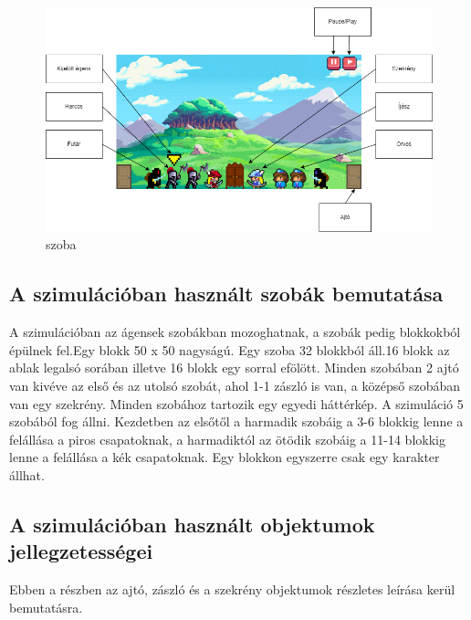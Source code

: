 \begin{figure}[!ht]
	\centering
	\includegraphics[width=\textwidth]{images/scene.png}
    \caption{szoba}
    \label{fig:scene}
\end{figure}
\newpage
\subsection{A szimulációban használt szobák bemutatása}

A szimulációban az ágensek szobákban mozoghatnak, a szobák pedig blokkokból épülnek fel.Egy blokk 50 x 50 nagyságú. Egy szoba 32  blokkból áll.16 blokk az ablak legalsó sorában illetve 16 blokk egy sorral efölött. Minden szobában 2 ajtó van kivéve az első és az utolsó szobát, ahol 1-1 zászló is van, a középső szobában van egy szekrény. Minden szobához tartozik egy egyedi háttérkép.
\newline
A szimuláció 5 szobából fog állni. Kezdetben az elsőtől a harmadik szobáig a 3-6 blokkig lenne a felállása a piros csapatoknak, a harmadiktól az ötödik szobáig a 11-14 blokkig lenne a felállása a kék csapatoknak. Egy blokkon egyszerre csak egy karakter állhat.

\subsection{A szimulációban használt objektumok jellegzetességei}

Ebben a részben az ajtó, zászló és a szekrény objektumok részletes leírása kerül bemutatásra.

